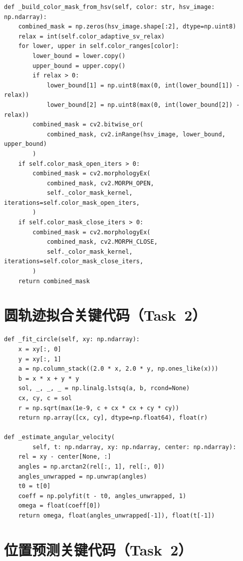 \documentclass[12pt,a4paper]{article}
\begin{document}
\begin{lstlisting}[caption={HSV 颜色掩膜生成（\texttt{\_build\_color\_mask\_from\_hsv}）}]
def _build_color_mask_from_hsv(self, color: str, hsv_image: np.ndarray):
    combined_mask = np.zeros(hsv_image.shape[:2], dtype=np.uint8)
    relax = int(self.color_adaptive_sv_relax)
    for lower, upper in self.color_ranges[color]:
        lower_bound = lower.copy()
        upper_bound = upper.copy()
        if relax > 0:
            lower_bound[1] = np.uint8(max(0, int(lower_bound[1]) - relax))
            lower_bound[2] = np.uint8(max(0, int(lower_bound[2]) - relax))
        combined_mask = cv2.bitwise_or(
            combined_mask, cv2.inRange(hsv_image, lower_bound, upper_bound)
        )
    if self.color_mask_open_iters > 0:
        combined_mask = cv2.morphologyEx(
            combined_mask, cv2.MORPH_OPEN,
            self._color_mask_kernel, iterations=self.color_mask_open_iters,
        )
    if self.color_mask_close_iters > 0:
        combined_mask = cv2.morphologyEx(
            combined_mask, cv2.MORPH_CLOSE,
            self._color_mask_kernel, iterations=self.color_mask_close_iters,
        )
    return combined_mask
\end{lstlisting}

\section{圆轨迹拟合关键代码（Task~2）}
\label{app:circle_fit}

\begin{lstlisting}[caption={最小二乘圆轨迹拟合（\texttt{\_fit\_circle}）与角速度估计（\texttt{\_estimate\_angular\_velocity}）}]
def _fit_circle(self, xy: np.ndarray):
    x = xy[:, 0]
    y = xy[:, 1]
    a = np.column_stack((2.0 * x, 2.0 * y, np.ones_like(x)))
    b = x * x + y * y
    sol, _, _, _ = np.linalg.lstsq(a, b, rcond=None)
    cx, cy, c = sol
    r = np.sqrt(max(1e-9, c + cx * cx + cy * cy))
    return np.array([cx, cy], dtype=np.float64), float(r)

def _estimate_angular_velocity(
        self, t: np.ndarray, xy: np.ndarray, center: np.ndarray):
    rel = xy - center[None, :]
    angles = np.arctan2(rel[:, 1], rel[:, 0])
    angles_unwrapped = np.unwrap(angles)
    t0 = t[0]
    coeff = np.polyfit(t - t0, angles_unwrapped, 1)
    omega = float(coeff[0])
    return omega, float(angles_unwrapped[-1]), float(t[-1])
\end{lstlisting}

\section{位置预测关键代码（Task~2）}
\label{app:predict}
\end{document}
